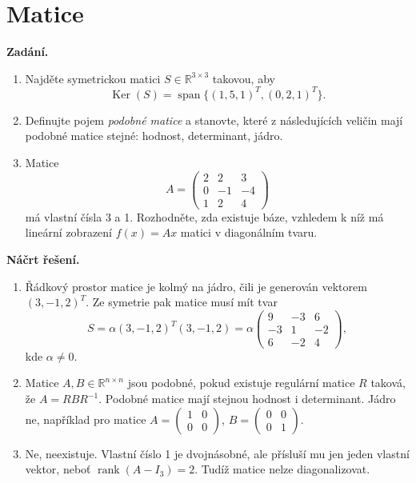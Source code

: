 \section{Matice}

\noindent\textbf{Zadání.}\par
\begin{enumerate}
  \item Najděte symetrickou matici $S \in \mathbb{R}^{3 \times 3}$ takovou, aby
    \[
      \operatorname{Ker}(S) = \operatorname{span}\{(1,5,1)^T, (0,2,1)^T\}.
    \]
  \item Definujte pojem \textit{podobné matice} a stanovte, které z následujících veličin mají podobné matice stejné: hodnost, determinant, jádro.
  \item Matice
    \[
      A = \begin{pmatrix}
        2 & 2 & 3 \\
        0 & -1 & -4 \\
        1 & 2 & 4
      \end{pmatrix}
    \]
    má vlastní čísla 3 a 1. Rozhodněte, zda existuje báze, vzhledem k níž má lineární zobrazení $f(x) = Ax$ matici v diagonálním tvaru.
\end{enumerate}

\medskip
\noindent\textbf{Náčrt řešení.}\par
\begin{enumerate}
  \item Řádkový prostor matice je kolmý na jádro, čili je generován vektorem $(3,-1,2)^T$. Ze symetrie pak matice musí mít tvar
    \[
      S = \alpha(3,-1,2)^T(3,-1,2) = \alpha \begin{pmatrix}
        9 & -3 & 6 \\
        -3 & 1 & -2 \\
        6 & -2 & 4
      \end{pmatrix},
    \]
    kde $\alpha \neq 0$.
  \item Matice $A, B \in \mathbb{R}^{n \times n}$ jsou podobné, pokud existuje regulární matice $R$ taková, že $A = RBR^{-1}$. Podobné matice mají stejnou hodnost i determinant. Jádro ne, například pro matice $A = \begin{pmatrix} 1 & 0 \\ 0 & 0 \end{pmatrix}$, $B = \begin{pmatrix} 0 & 0 \\ 0 & 1 \end{pmatrix}$.
  \item Ne, neexistuje. Vlastní číslo 1 je dvojnásobné, ale přísluší mu jen jeden vlastní vektor, neboť $\operatorname{rank}(A - I_3) = 2$. Tudíž matice nelze diagonalizovat.
\end{enumerate}

